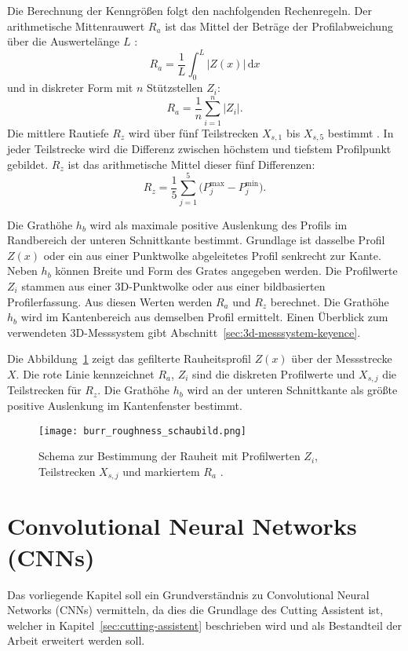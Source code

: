 Die Berechnung der Kenngrößen folgt den nachfolgenden Rechenregeln. Der arithmetische Mittenrauwert \(R_a\) ist das Mittel der Beträge der Profilabweichung über die Auswertelänge \(L\) \parencite{MitutoyoQuickGuide}:
\[
R_a=\frac{1}{L}\int_{0}^{L}\lvert Z(x)\rvert\,\mathrm{d}x
\]
und in diskreter Form mit \(n\) Stützstellen \(Z_i\):
\[
R_a=\frac{1}{n}\sum_{i=1}^{n}\lvert Z_i\rvert.
\]
Die mittlere Rautiefe \(R_z\) wird über fünf Teilstrecken \(X_{s,1}\) bis \(X_{s,5}\) bestimmt \parencite{KeyenceISO4287}. In jeder Teilstrecke wird die Differenz zwischen höchstem und tiefstem Profilpunkt gebildet. \(R_z\) ist das arithmetische Mittel dieser fünf Differenzen:
\[
R_z=\frac{1}{5}\sum_{j=1}^{5}\bigl(P^{\max}_{j}-P^{\min}_{j}\bigr).
\]

Die Grathöhe \(h_b\) wird als maximale positive Auslenkung des Profils im Randbereich der unteren Schnittkante bestimmt. Grundlage ist dasselbe Profil \(Z(x)\) oder ein aus einer Punktwolke abgeleitetes Profil senkrecht zur Kante. Neben \(h_b\) können Breite und Form des Grates angegeben werden.
Die Profilwerte \(Z_i\) stammen aus einer 3D-Punktwolke oder aus einer bildbasierten Profilerfassung. Aus diesen Werten werden \(R_a\) und \(R_z\) berechnet. Die Grathöhe \(h_b\) wird im Kantenbereich aus demselben Profil ermittelt. Einen Überblick zum verwendeten 3D-Messsystem gibt Abschnitt~\ref{sec:3d-messsystem-keyence}.

Die Abbildung~\ref{fig:roughness-profile} zeigt das gefilterte Rauheitsprofil \(Z(x)\) über der Messstrecke \(X\).
Die rote Linie kennzeichnet \(R_a\), \(Z_i\) sind die diskreten Profilwerte und \(X_{s,j}\) die Teilstrecken für \(R_z\). Die Grathöhe \(h_b\) wird an der unteren Schnittkante als größte positive Auslenkung im Kantenfenster bestimmt.

\begin{figure}[htbp]
  \centering
  \texttt{[image: burr\_roughness\_schaubild.png]}
  \caption[Schema zur Bestimmung der Rauheit]{Schema zur Bestimmung der Rauheit mit Profilwerten \(Z_i\), Teilstrecken \(X_{s,j}\) und markiertem \(R_a\) \parencite{Timesavers_Rauheit_Ra}.}
  \label{fig:roughness-profile}
\end{figure}

\section{Convolutional Neural Networks (CNNs)}
\label{sec:cnns}

Das vorliegende Kapitel soll ein Grundverständnis zu Convolutional Neural Networks (CNNs) vermitteln, da dies die Grundlage des Cutting Assistent ist, welcher in Kapitel~\ref{sec:cutting-assistent} beschrieben wird und als Bestandteil der Arbeit erweitert werden soll.

